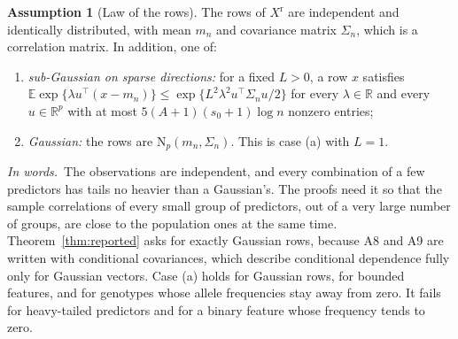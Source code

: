 \documentclass[11pt]{article}
\newcommand{\R}{\mathbb{R}}
\newcommand{\E}{\mathbb{E}}
\newcommand{\N}{\mathrm{N}}
\newcommand{\Xr}{X^{\mathrm r}}
\newcommand{\sz}{s_0}
\newcommand{\Sig}{\Sigma_n}
\theoremstyle{plain}
\theoremstyle{definition}
\newtheorem{asm}{Assumption}
\newcommand{\words}{\par\smallskip\noindent\textit{In words.}\ }
\begin{document}
\begin{asm}[Law of the rows]\label{a:rows}
The rows of $\Xr$ are independent and identically distributed, with mean $m_n$ and covariance matrix $\Sig$, which is a
correlation matrix. In addition, one of:
\begin{enumerate}[label=(\alph*)]
  \item \emph{sub-Gaussian on sparse directions:} for a fixed $L>0$, a row $x$ satisfies
    $\E\exp\{\lambda u^\top(x-m_n)\}\le\exp\{L^2\lambda^2u^\top\Sig u/2\}$ for every $\lambda\in\R$ and every $u\in\R^p$
    with at most $5(A+1)(\sz+1)\log n$ nonzero entries;
  \item \emph{Gaussian:} the rows are $\N_p(m_n,\Sig)$. This is case (a) with $L=1$.
\end{enumerate}
\end{asm}
\words The observations are independent, and every combination of a few predictors has tails no heavier than a
Gaussian's. The proofs need it so that the sample correlations of every small group of predictors, out of a very large
number of groups, are close to the population ones at the same time. Theorem~\ref{thm:reported} asks for exactly
Gaussian rows, because A8 and A9 are written with conditional covariances, which describe conditional dependence fully
only for Gaussian vectors. Case (a) holds for Gaussian rows, for bounded features, and for genotypes whose allele
frequencies stay away from zero. It fails for heavy-tailed predictors and for a binary feature whose frequency tends to
zero.
\end{document}
